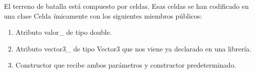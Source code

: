 El terreno de batalla está compuesto por celdas.
Esas celdas se han codificado en una clase Celda únicamente con los siguientes miembros públicos:
{\begin{enumerate}
    \item Atributo valor\_ de tipo double.
    \item Atributo vector3\_ de tipo Vector3 que nos viene ya declarado en una librería.
    \item Constructor que recibe ambos parámetros y constructor predeterminado.
\end{enumerate}}